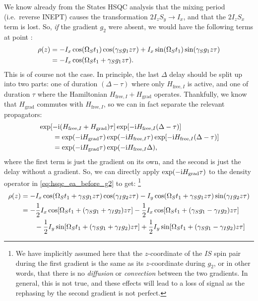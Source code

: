 We know already from the States HSQC analysis that the mixing period (i.e.\ reverse INEPT) causes the transformation $2I_zS_y \to I_x$, and that the $2I_zS_x$ term is lost.
So, \textit{if} the gradient $g_2$ were absent, we would have the following terms at point :
\begin{align}
    \label{eq:hsqc_ea_before_g2}
    \rho(z) &= -I_x\cos(\Omega_S t_1)\cos(\gamma_S g_1 z \tau) + I_x\sin(\Omega_S t_1)\sin(\gamma_S g_1 z \tau) \notag \\
            &= -I_x\cos(\Omega_S t_1 + \gamma_S g_1 z\tau).
\end{align}
This is of course not the case.
In principle, the last $\Delta$ delay should be split up into two parts: one of duration $(\Delta - \tau)$ where only $H_{\text{free},I}$ is active, and one of duration $\tau$ where the Hamiltonian $H_{\text{free},I} + H_\text{grad}$ operates.
Thankfully, we know that $H_\text{grad}$ commutes with $H_{\text{free},I}$, so we can in fact separate the relevant propagators:
\begin{align}
    \label{eq:propagators_gradient_echo}
    \MoveEqLeft \exp[-\mi(H_{\text{free},I} + H_\text{grad})\tau]\exp[-\mi H_{\text{free},I}(\Delta - \tau)] \notag \\
    &= \exp(-\mi H_\text{grad}\tau) \exp(-\mi H_{\text{free},I}\tau)\exp[-\mi H_{\text{free},I}(\Delta - \tau)] \notag \\
    &= \exp(-\mi H_\text{grad}\tau) \exp(-\mi H_{\text{free},I}\Delta),
\end{align}
where the first term is just the gradient on its own, and the second is just the delay without a gradient.
So, we can directly apply $\exp(-\mathrm{i} H_\text{grad}\tau)$ to the density operator in \cref{eq:hsqc_ea_before_g2} to get:%
\footnote{We have implicitly assumed here that the $z$-coordinate of the $IS$ spin pair during the first gradient is the same as its $z$-coordinate during $g_2$, or in other words, that there is no \textit{diffusion} or \textit{convection} between the two gradients. In general, this is not true, and these effects will lead to a loss of signal as the rephasing by the second gradient is not perfect.}
\begin{align}
    \rho(z) &= -I_x\cos(\Omega_S t_1 + \gamma_S g_1 z \tau)\cos(\gamma_I g_2 z\tau) - I_y\cos(\Omega_S t_1 + \gamma_S g_1 z \tau)\sin(\gamma_I g_2 z\tau) \label{eq:hsqc_ea_after_g2_1} \\
            &= -\frac{1}{2}I_x \cos[\Omega_S t_1 + (\gamma_S g_1 + \gamma_I g_2)z\tau] -\frac{1}{2} I_x \cos[\Omega_S t_1 + (\gamma_S g_1 - \gamma_I g_2) z\tau]  \notag \\
            &\quad\quad - \frac{1}{2}I_y \sin[\Omega_S t_1 + (\gamma_S g_1 + \gamma_I g_2) z\tau] + \frac{1}{2}I_y \sin[\Omega_S t_1 + (\gamma_S g_1 - \gamma_I g_2) z\tau] 
            \label{eq:hsqc_ea_after_g2_2}
\end{align}
